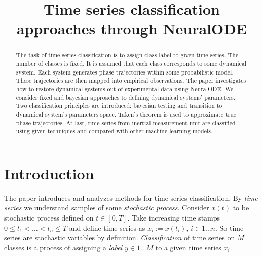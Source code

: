 \documentclass[referee, pdflatex, sn-mathphys-num]{sn-jnl}
\theoremstyle{definition}
\theoremstyle{plain}
\begin{document}
	
	\title{Time series classification approaches through NeuralODE}
	
	\author*[1]{ }
	\author*[2]{ }
	
	
	
	\maketitle
	
	\begin{abstract}
		
		The task of time series classification is to assign class label to given time series. The number of classes is fixed. It is assumed that each class corresponds to some dynamical system. Each system generates phase trajectories within some probabilistic model. These trajectories are then mapped into empirical observations. The paper investigates how to restore dynamical systems out of experimental data using NeuralODE. We consider fixed and bayesian approaches to defining dynamical systems' parameters. Two classification principles are introduced: bayesian testing and transition to dynamical system's parameters space. Taken's theorem is used to approximate true phase trajectories. At last, time series from inertial measurement unit are classified using given techniques and compared with other machine learning models.
		
	\end{abstract}
	
	\section{Introduction}\label{Intro}
	
		The paper introduces and analyzes methods for time series classification. By \emph{time series} we understand samples of some \emph{stochastic process}. Consider $x(t)$ to be stochastic process defined on $t \in [0, T]$. Take increasing time stamps $0 \le t_1 < \ldots < t_n \le T$ and define time series as $x_i := x(t_i), \, i \in 1 \ldots n$. So time series are stochastic variables by definition. \emph{Classification} of time series on $M$ classes is a process of assigning a \emph{label} $y \in 1 \ldots M$ to a given time series $x_i$.
		
\end{document}
